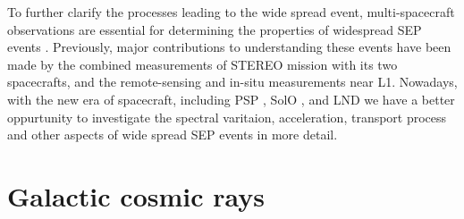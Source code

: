 To further clarify the processes leading to the wide spread event, multi-spacecraft observations are essential for determining the properties of widespread SEP events \citep{Kolhoff2021AA}. Previously, major contributions to understanding these events have been made by the combined measurements of \ac{STEREO} mission with its two spacecrafts, and the remote-sensing and in-situ measurements near \ac{L1}. Nowadays, with the new era of spacecraft, including \acl{PSP} \citep{Fox2016SSRv}, \acl{SolO}  \citep{Mueller-2020-SolO}, and \acl{LND} \citep{Wimmer2020SSRv} we have a better oppurtunity to investigate the spectral varitaion, acceleration, transport process and other aspects of wide spread \ac{SEP} events in more detail.





\section{Galactic cosmic rays}

